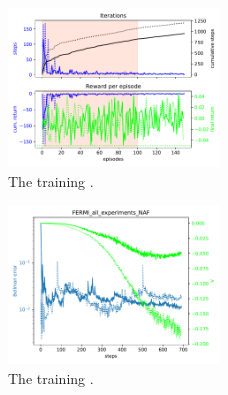 \documentclass[
 reprint,
 amsmath,amssymb,amsfonts,clevref,
 aps,
prstab,
]{revtex4-2}
\begin{document}
\begin{figure}[!h]
  \centering
  \includegraphics*[width=0.5\textwidth]{Figures/FERMI_all_experiments_NAF_episodes.pdf}
  \caption{The training .}
  \label{fig:comparsion_per}
\end{figure}
\begin{figure}[!h]
  \centering
  \includegraphics*[width=0.5\textwidth]{Figures/FERMI_all_experiments_NAF_convergence.pdf}
  \caption{The training .}
  \label{fig:comparsion_per}
\end{figure}




% 
\end{document}
